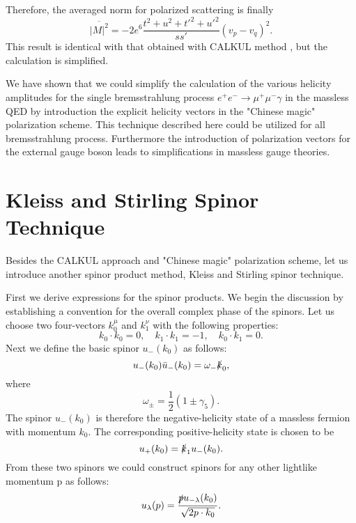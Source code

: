 Therefore, the averaged norm for polarized scattering is finally
\begin{equation}
\overline{|M|^2}=-2e^6\frac{t^2+u^2+t'^2+u'^2}{ss'}(v_p-v_q)^2.
\end{equation}
This result is identical with that obtained with CALKUL method \cite{calkul4}, but the calculation is simplified. 

We have shown that we could simplify the calculation of the various helicity amplitudes for the single bremsstrahlung process $e^+e^-\to\mu^+\mu^-\gamma$ in the massless QED by introduction the explicit helicity vectors in the "Chinese magic" polarization scheme. This technique described here could be utilized for all bremsstrahlung process. Furthermore the introduction of polarization vectors for the external gauge boson leads to simplifications in massless gauge theories.

\newpage
\section{Kleiss and Stirling Spinor Technique}
Besides the CALKUL approach and "Chinese magic" polarization scheme, let us introduce another spinor product method, Kleiss and Stirling spinor technique\cite{KS}.

First we derive expressions for the spinor products. We begin the discussion by establishing a convention for the overall complex phase of the spinors. Let us choose two four-vectors $k_0^\mu$ and $k_1^\nu$ with the following properties:
\begin{equation}
k_0\cdot k_0=0,\quad k_1\cdot k_1=-1,\quad k_0\cdot k_1=0.
\end{equation}
Next we define the basic spinor $u_-(k_0)$ as follows:
\begin{equation}
u_-(k_0)\bar{u}_-(k_0)=\omega_-\slashed k_0,
\end{equation}
where
\begin{equation}
\omega_\pm=\frac{1}{2}(1\pm\gamma_5).
\end{equation}
The spinor $u_-(k_0)$ is therefore the negative-helicity state of a massless fermion with momentum $k_0$. The corresponding positive-helicity state is chosen to be
\begin{equation}
u_+(k_0)=\slashed k_1 u_-(k_0).
\end{equation}
From these two spinors we could construct spinors for any other lightlike momentum p as follows:
\begin{equation}
u_\lambda(p)=\frac{\slashed p u_{-\lambda}(k_0)}{\sqrt{2p\cdot k_0}}.
\end{equation}

